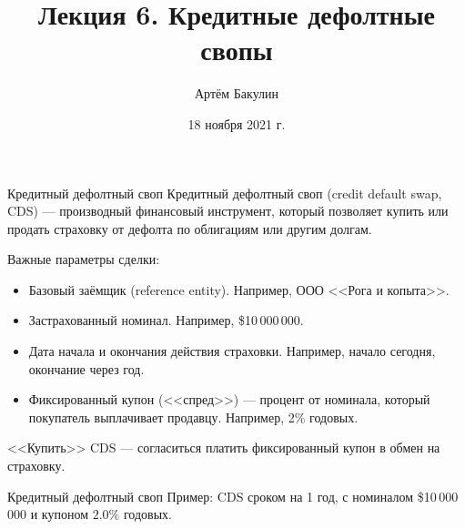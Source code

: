 \documentclass{beamer}
\title{Лекция 6. Кредитные дефолтные свопы}
\author{Артём Бакулин}
\date{18 ноября 2021 г.}
\begin{document}
\begin{frame}
\titlepage
\end{frame}

\begin{frame}{Кредитный дефолтный своп}
\justify
\alert{Кредитный дефолтный своп} (credit default swap, CDS) --- производный финансовый инструмент, который позволяет купить или продать страховку от дефолта по облигациям или другим долгам.

\justify
Важные параметры сделки:
\begin{itemize}
\justifying
\item Базовый заёмщик (reference entity). Например, ООО <<Рога и копыта>>.
\item Застрахованный номинал. Например, \$10\,000\,000.
\item Дата начала и окончания действия страховки. Например, начало сегодня, окончание через год.
\item Фиксированный купон (<<спред>>) --- процент от номинала, который покупатель выплачивает продавцу. Например, 2\% годовых.
\end{itemize}

\justify
<<Купить>> CDS --- согласиться платить фиксированный купон в обмен на страховку.
\end{frame}



\newcommand{\swapPartyNode}[5]{

	\draw (#1, #2)
		node[
			rectangle,
			draw,
			rounded corners,
			anchor = south,
			minimum height = 0.8cm,
			minimum width = 2.5cm
		]
		{#5}
	--
	(#3, #4);
}

\newcommand{\swapBuyerPaymentEx}[7]{

	\draw [
		->,
		>=triangle 90
	] 
	(#1, #2)
	node[
		label = left:{#7}
	]{}
	-- (#3, #4)
	node[
		pos=0.5,
		anchor=south
	]
	{#5}
	node[
		pos=0.5,
		anchor=north
	]
	{#6};
}

\newcommand{\swapBuyerPayment}[6]{

	\swapBuyerPaymentEx{#1}{#2}{#3}{#4}{#5}{}{#6}
}

\begin{frame}{Кредитный дефолтный своп}
\justify
Пример: CDS сроком на 1 год, с номиналом \$10\,000\,000 и купоном $2.0\%$ годовых.

\justify
\centering
{}
\end{frame}
\end{document}
